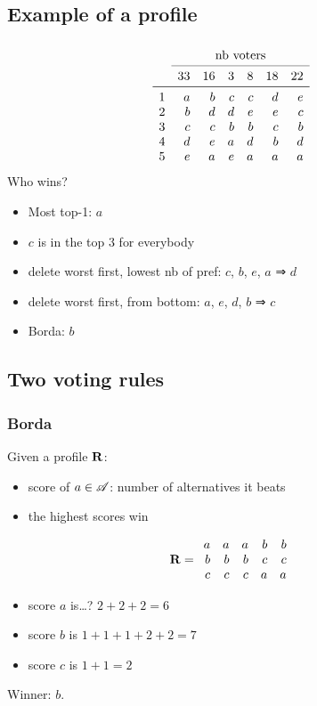 \documentclass[french, english]{beamer}
\begin{document}
\subsection{Example of a profile}
\begin{frame}[fragile]
	\frametitle{\subsecname}
	\begin{equation}
		\begin{array}{lrrrrrr}
			&\multicolumn{6}{c}{\text{nb voters}}\\
		\cmidrule{2-7}
				&33	&16	&3	&8	&18	&22	\\
		\midrule
			1	&a	&b	&c	&c	&d	&e	\\
			2	&b	&d	&d	&e	&e	&c	\\
			3	&c	&c	&b	&b	&c	&b	\\
			4	&d	&e	&a	&d	&b	&d	\\
			5	&e	&a	&e	&a	&a	&a	\\
		\end{array}
	\end{equation}
	Who wins?\pause
	\begin{itemize}
		\item Most top-1: $a$
		\item $c$ is in the top 3 for everybody
		\item delete worst first, lowest nb of pref: $c$, $b$, $e$, $a$ ⇒ $d$
		\item delete worst first, from bottom: $a$, $e$, $d$, $b$ ⇒ $c$
		\item Borda: $b$
	\end{itemize}
\end{frame}

\subsection{Two voting rules}
\begin{frame}
	\frametitle{Borda}
	
Given a profile $\mathbf{R}$:
	\begin{itemize}
		\item score of $a \in \mathscr{A}$: number of alternatives it beats
		\item the highest scores win
	\end{itemize}
	
	\begin{equation}
		\mathbf{R} =
		\begin{array}{rrrrr}
			a	&	a	&	a	&	b	&	b\\
			b	&	b	&	b	&	c	&	c\\
			c	&	c	&	c	&	a	&	a
		\end{array}
	\end{equation}
	\begin{itemize}
		\item score $a$ is\dots? \pause $2 + 2 + 2 = 6$
		\item score $b$ is $1 + 1 + 1 + 2 + 2 = 7$
		\item score $c$ is $1 + 1 = 2$
	\end{itemize}
	Winner: $b$.
\end{frame}
\end{document}
